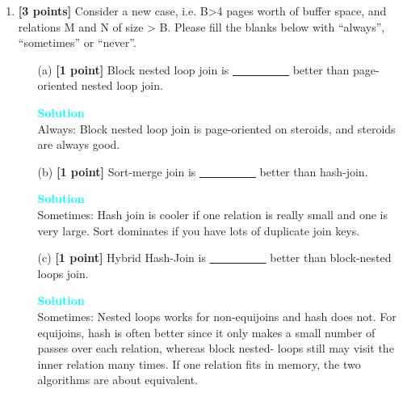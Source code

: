 \documentclass[10pt]{article}
\newenvironment{solution}
    { \begin{mdframed}[backgroundcolor=gray!10] \textcolor{cyan}{\textbf{Solution}} \\}
    {  \end{mdframed}}
\begin{document}
\begin{enumerate}
	\item \textbf{[3 points]}
	      Consider a new case, i.e. B>4 pages worth of buffer space, and relations M and N of size > B.
	      Please fill the blanks below with ``always'', ``sometimes'' or ``never''.
	      \begin{itemize}
		      \item[(a)] \textbf{[1 point]} Block nested loop join is \underline{\ \ \ \ \ \ \ \ \ \ } better than page-oriented nested loop join.
		            \begin{solution}
			            Always: Block nested loop join is page-oriented on steroids, and steroids are always good.
		            \end{solution}
		      \item[(b)] \textbf{[1 point]} Sort-merge join is \underline{\ \ \ \ \ \ \ \ \ \ } better than hash-join.
		            \begin{solution}
			            Sometimes: Hash join is cooler if one relation is really small and one is very large. Sort dominates if you have lots of duplicate join keys.
		            \end{solution}
		      \item[(c)] \textbf{[1 point]} Hybrid Hash-Join is \underline{\ \ \ \ \ \ \ \ \ \ } better than block-nested loops join.
		            \begin{solution}
			            Sometimes: Nested loops works for non-equijoins and hash does not.
			            For equijoins, hash is often better since it only makes a small number of passes over each relation, whereas block nested- loops still may visit the inner relation many times. If one relation fits in memory, the two algorithms are about equivalent.
		            \end{solution}
	      \end{itemize}
\end{enumerate}



\newpage
\end{document}
